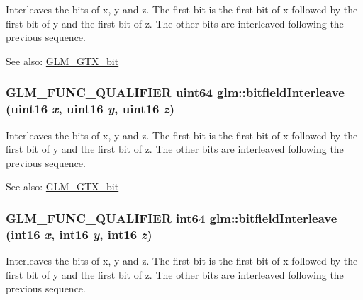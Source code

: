 Interleaves the bits of x, y and z. The first bit is the first bit of x followed by the first bit of y and the first bit of z. The other bits are interleaved following the previous sequence.

\begin{Desc}
\item[See also:]\hyperlink{group__gtx__bit}{GLM\_\-GTX\_\-bit} \end{Desc}
\hypertarget{group__gtx__bit_g3c170e2ec54f2faab5e1c5bb693d718d}{
\subsubsection[bitfieldInterleave]{\setlength{\rightskip}{0pt plus 5cm}GLM\_\-FUNC\_\-QUALIFIER uint64 glm::bitfieldInterleave (uint16 {\em x}, \/  uint16 {\em y}, \/  uint16 {\em z})}}
\label{group__gtx__bit_g3c170e2ec54f2faab5e1c5bb693d718d}


Interleaves the bits of x, y and z. The first bit is the first bit of x followed by the first bit of y and the first bit of z. The other bits are interleaved following the previous sequence.

\begin{Desc}
\item[See also:]\hyperlink{group__gtx__bit}{GLM\_\-GTX\_\-bit} \end{Desc}
\hypertarget{group__gtx__bit_gf898f842ac089fcc8d6201c32702584a}{
\subsubsection[bitfieldInterleave]{\setlength{\rightskip}{0pt plus 5cm}GLM\_\-FUNC\_\-QUALIFIER int64 glm::bitfieldInterleave (int16 {\em x}, \/  int16 {\em y}, \/  int16 {\em z})}}
\label{group__gtx__bit_gf898f842ac089fcc8d6201c32702584a}


Interleaves the bits of x, y and z. The first bit is the first bit of x followed by the first bit of y and the first bit of z. The other bits are interleaved following the previous sequence.

